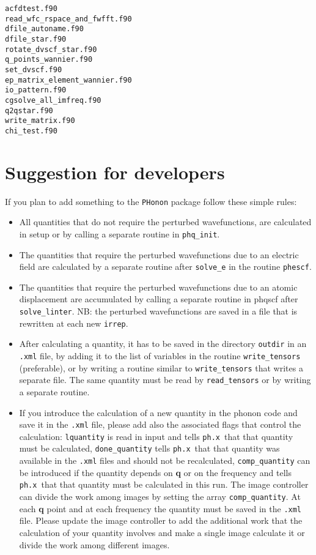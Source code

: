 \documentclass[12pt,a4paper]{article}
\def\phx{\texttt{ph.x}}
\begin{document}
\begin{verbatim}
acfdtest.f90              
read_wfc_rspace_and_fwfft.f90
dfile_autoname.f90          
dfile_star.f90             
rotate_dvscf_star.f90
q_points_wannier.f90
set_dvscf.f90
ep_matrix_element_wannier.f90     
io_pattern.f90                    
cgsolve_all_imfreq.f90            
q2qstar.f90
write_matrix.f90
chi_test.f90                      
\end{verbatim}

\section{Suggestion for developers}

If you plan to add something to the \texttt{PHonon} package follow these
simple rules:

\begin{itemize}

\item
All quantities that do not require the perturbed wavefunctions, are
calculated in setup or by calling a separate routine in \texttt{phq\_init}. 

\item
The quantities that require the perturbed wavefunctions due to an
electric field are calculated by a separate routine after 
\texttt{solve\_e} in the routine \texttt{phescf}.

\item
The quantities that require the perturbed wavefunctions due to an
atomic displacement are accumulated by calling a separate routine
in phqscf after \texttt{solve\_linter}. 
NB: the perturbed wavefunctions are saved in a file that is rewritten at
each new \texttt{irrep}.

\item
After calculating a quantity, it has to be saved in the directory
\texttt{outdir} in an \texttt{.xml} file, by adding it to the list 
of variables in the routine \texttt{write\_tensors}  
(preferable), or by writing a routine similar to \texttt{write\_tensors} 
that writes a separate file. The same quantity must be read by 
\texttt{read\_tensors} or by writing a separate routine.

\item
If you introduce the calculation of a new quantity in the phonon code 
and save it in the \texttt{.xml} file, please add also the associated flags 
that control the calculation: 
\texttt{lquantity} is read in input and tells \phx\ that that quantity must be 
calculated, \texttt{done\_quantity} tells \phx\ that that quantity 
was available in the \texttt{.xml} files and should not be recalculated, 
\texttt{comp\_quantity} can be introduced if the quantity depends on 
{\bf q} or on the frequency and tells \phx\ that that quantity must be 
calculated in this run. The image controller can divide the work among images
by setting the array \texttt{comp\_quantity}. At each {\bf q} point and 
at each frequency the quantity must be saved in the \texttt{.xml} file.
Please update the image controller to add the additional work that the 
calculation of your quantity involves and make a single image calculate it 
or divide the work among different images.


\end{itemize}
\end{document}
